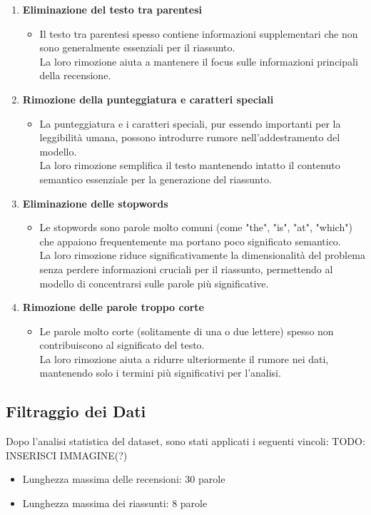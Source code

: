 \documentclass[a4paper, 12pt]{article}
\begin{document}
\begin{enumerate}
    \item \textbf{Eliminazione del testo tra parentesi}
    \begin{itemize}
        \item Il testo tra parentesi spesso contiene informazioni supplementari che non sono generalmente essenziali per il riassunto.\\ 
        La loro rimozione aiuta a mantenere il focus sulle informazioni principali della recensione.
    \end{itemize}

    \item \textbf{Rimozione della punteggiatura e caratteri speciali}
    \begin{itemize}
        \item La punteggiatura e i caratteri speciali, pur essendo importanti per la leggibilità umana, possono introdurre rumore nell'addestramento del modello.\\
        La loro rimozione semplifica il testo mantenendo intatto il contenuto semantico essenziale per la generazione del riassunto.
    \end{itemize}

    \item \textbf{Eliminazione delle stopwords}
    \begin{itemize}
        \item Le stopwords sono parole molto comuni (come "the", "is", "at", "which") che appaiono frequentemente ma portano poco significato semantico.\\
        La loro rimozione riduce significativamente la dimensionalità del problema senza perdere informazioni cruciali per il riassunto, permettendo al modello di concentrarsi sulle parole più significative.
    \end{itemize}

    \item \textbf{Rimozione delle parole troppo corte}
    \begin{itemize}
        \item Le parole molto corte (solitamente di una o due lettere) spesso non contribuiscono al significato del testo.\\
        La loro rimozione aiuta a ridurre ulteriormente il rumore nei dati, mantenendo solo i termini più significativi per l'analisi.
    \end{itemize}
\end{enumerate}

\subsection{Filtraggio dei Dati}
Dopo l'analisi statistica del dataset, sono stati applicati i seguenti vincoli:
TODO: INSERISCI IMMAGINE(?)
\begin{itemize}
    \item Lunghezza massima delle recensioni: 30 parole
    \item Lunghezza massima dei riassunti: 8 parole
\end{itemize}
\end{document}
